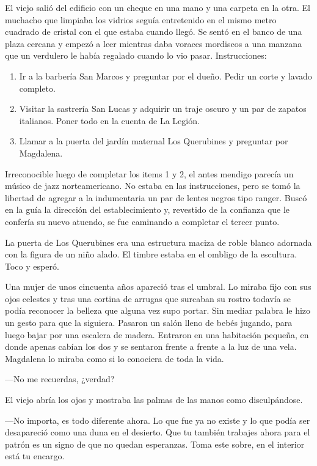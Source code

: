 \documentclass[11pt,twoside,openright,a5paper]{book}
\begin{document}
El viejo salió del edificio con un cheque en una mano y una carpeta en la otra. El muchacho que limpiaba los vidrios seguía entretenido en el mismo metro cuadrado de cristal con el que estaba cuando llegó. Se sentó en el banco de una plaza cercana y empezó a leer mientras daba voraces mordiscos a una manzana que un verdulero le había regalado cuando lo vio pasar. Instrucciones:

\begin{enumerate}
\item{Ir a la barbería San Marcos y preguntar por el dueño. Pedir un corte y lavado completo.}
\item{Visitar la sastrería San Lucas y adquirir un traje oscuro y un par de zapatos italianos. Poner todo en la cuenta de La Legión.}
\item{Llamar a la puerta del jardín maternal Los Querubines y preguntar por Magdalena.}
\end{enumerate}

Irreconocible luego de completar los items 1 y 2, el antes mendigo parecía un músico de jazz norteamericano. No estaba en las instrucciones, pero se tomó la libertad de agregar a la indumentaria un par de lentes negros tipo ranger. Buscó en la guía la dirección del establecimiento y, revestido de la confianza que le confería su nuevo atuendo, se fue caminando a completar el tercer punto.

La puerta de Los Querubines era una estructura maciza de roble blanco adornada con la figura de un niño alado. El timbre estaba en el ombligo de la escultura. Toco y esperó.

Una mujer de unos cincuenta años apareció tras el umbral. Lo miraba fijo con sus ojos celestes y tras una cortina de arrugas que surcaban su rostro todavía se podía reconocer la belleza que alguna vez supo portar. Sin mediar palabra le hizo un gesto para que la siguiera. Pasaron un salón lleno de bebés jugando, para luego bajar por una escalera de madera. Entraron en una habitación pequeña, en donde apenas cabían los dos y se sentaron frente a frente a la luz de una vela. Magdalena lo miraba como si lo conociera de toda la vida.

---No me recuerdas, ¿verdad?

El viejo abría los ojos y mostraba las palmas de las manos como disculpándose.

---No importa, es todo diferente ahora. Lo que fue ya no existe y lo que podía ser desapareció como una duna en el desierto. Que tu también trabajes ahora para el patrón es un signo de que no quedan esperanzas. Toma este sobre, en el interior está tu encargo.
\end{document}
